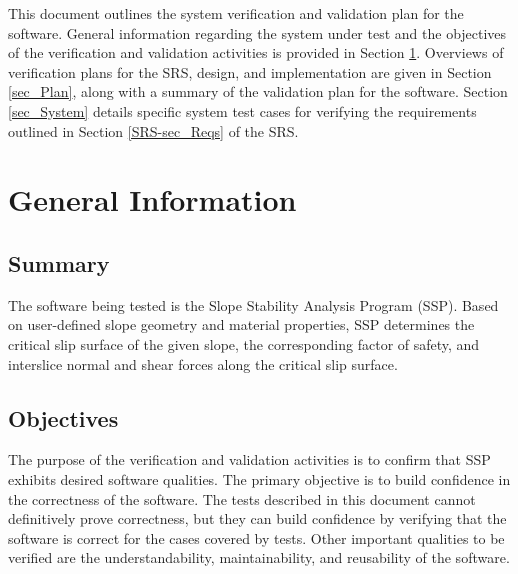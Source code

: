 \documentclass[12pt, titlepage]{article}
\newcommand{\progname}{SSP}
\begin{document}
\newpage

\tableofcontents

\listoftables



\listoffigures

\newpage


\noindent This document outlines the system verification and validation plan 
for the software. General information regarding the system under test and the 
objectives of the verification and validation activities is provided in Section 
\ref{sec_GenInfo}. Overviews of verification plans for the SRS, design, and 
implementation are given in Section \ref{sec_Plan}, along with a summary of the 
validation plan for the software. Section \ref{sec_System} details specific  
system test cases for verifying the requirements outlined in Section 
\ref{SRS-sec_Reqs} of the SRS.

\section{General Information} \label{sec_GenInfo}

\subsection{Summary}

\noindent The software being tested is the Slope Stability Analysis Program 
(\progname{}). Based on user-defined slope geometry and material properties, 
\progname{} determines the critical slip surface of the given slope, the 
corresponding factor of safety, and interslice normal and shear forces along 
the critical slip surface.

\subsection{Objectives}

\noindent The purpose of the verification and validation activities is to 
confirm that \progname{} exhibits desired software qualities. The primary 
objective is to build confidence in the correctness of the software. The tests 
described in this document cannot definitively prove correctness, but they can 
build confidence by verifying that the software is correct for the cases 
covered by tests. Other important qualities to be verified are the 
understandability, maintainability, and reusability of the software.
\end{document}
